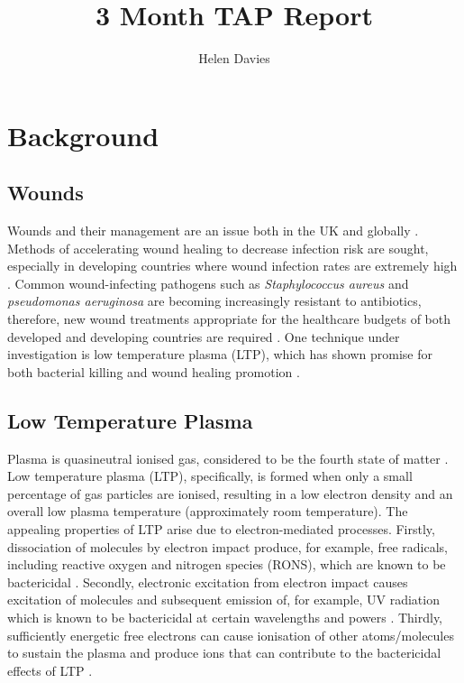 \documentclass[11pt, oneside]{article}   	%
\title{3 Month TAP Report}
\author{Helen Davies}
\date{}							%
\begin{document}
\maketitle

\section{Background}

\subsection{Wounds}

Wounds and their management are an issue both in the UK and globally \cite{Posnett2008burden}.
Methods of accelerating wound healing to decrease infection risk are sought, especially in developing countries where wound infection rates are extremely high \cite{Kihla2014risk}. 
Common wound-infecting pathogens such as \textit{Staphylococcus aureus} and \textit{pseudomonas aeruginosa} \cite{Church2006burn, Bowler2001wound} are becoming increasingly resistant to antibiotics, therefore, new wound treatments appropriate for the healthcare budgets of both developed and developing countries are required \cite{Chambers2009waves, Godebo2013multidrug, Howell2005a}.
One technique under investigation is low temperature plasma (LTP), which has shown promise for both bacterial killing and wound healing promotion \cite{Kong2009plasma, Kramer2013suitability, Isbary2012successful, Isbary2010a}.


\subsection{Low Temperature Plasma}

Plasma is quasineutral ionised gas, considered to be the fourth state of matter \cite{Fridman2013plasmamedicine}.
Low temperature plasma (LTP), specifically, is formed when only a small percentage of gas particles are ionised, resulting in a low electron density and an overall low plasma temperature (approximately room temperature).
The appealing properties of LTP arise due to electron-mediated processes.
Firstly, dissociation of molecules by electron impact produce, for example, free radicals, including reactive oxygen and nitrogen species (RONS), which are known to be bactericidal \cite{Kong2009plasma}.
Secondly, electronic excitation from electron impact causes excitation of molecules and subsequent emission of, for example, UV radiation which is known to be bactericidal at certain wavelengths and powers \cite{Laroussi2004evaluation}.
Thirdly, sufficiently energetic free electrons can cause ionisation of other atoms/molecules to sustain the plasma and produce ions that can contribute to the bactericidal effects of LTP \cite{Mendis2000a, Laroussi2002nonthermal}.
\end{document}
